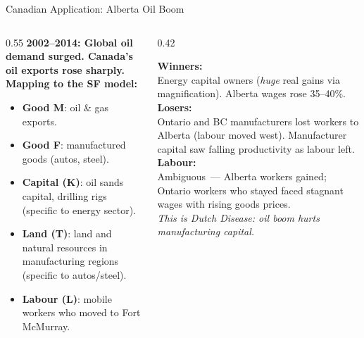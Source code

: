 \documentclass[aspectratio=169]{beamer}
\begin{document}
\begin{frame}{Canadian Application: Alberta Oil Boom}
\begin{columns}[T]
\begin{column}{0.55\textwidth}
\textbf{2002--2014: Global oil demand surged.
Canada's oil exports rose sharply.}\\[0.2em]
\textbf{Mapping to the SF model:}
\begin{itemize}\small
  \item \textbf{Good M}: oil \& gas exports.
  \item \textbf{Good F}: manufactured goods (autos, steel).
  \item \textbf{Capital (K)}: oil sands capital, drilling
        rigs (specific to energy sector).
  \item \textbf{Land (T)}: land and natural resources
        in manufacturing regions (specific to autos/steel).
  \item \textbf{Labour (L)}: mobile workers who moved
        to Fort McMurray.
\end{itemize}
\end{column}
\begin{column}{0.42\textwidth}
\begin{canadex}
\footnotesize\textbf{Winners:}\\
Energy capital owners (\emph{huge} real gains via
magnification).  Alberta wages rose 35--40\%.\\[0.3em]
\textbf{Losers:}\\
Ontario and BC manufacturers lost workers to Alberta
(labour moved west).  Manufacturer capital saw
falling productivity as labour left.\\[0.3em]
\textbf{Labour:}\\
Ambiguous~--- Alberta workers gained; Ontario workers
who stayed faced stagnant wages with rising goods
prices.\\[0.2em]
\textit{This is Dutch Disease: oil boom hurts
manufacturing capital.}
\end{canadex}
\end{column}
\end{columns}
\end{frame}
\end{document}
